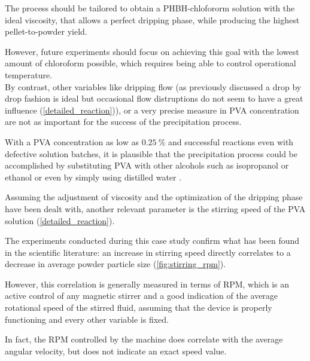 \documentclass{article}
\begin{document}
        The process should be tailored to obtain a PHBH-chlofororm solution with the ideal viscosity, that allows a perfect dripping 
        phase, while producing the highest pellet-to-powder yield. 

        However, future experiments should focus on achieving this goal with the lowest amount of chloroform possible, which requires 
        being able to control operational temperature. \\ 

        By contrast, other variables like dripping flow (as previously discussed a drop by drop fashion is ideal but occasional 
        flow distruptions do not seem to have a great influence (\ref{detailed_reaction})), or a very precise measure in 
        PVA concentration are not as important for the success of the precipitation process. 

        With a PVA concentration as low as $0.25 \ \%$ and successful reactions even with defective
        solution batches, it is plausible that the precipitation process could be accomplished by 
        substituting PVA with other alcohols such as isopropanol or ethanol or even by simply using distilled water \footnotemark.
        

        Assuming the adjustment of viscosity and the optimization of the dripping phase have been dealt with, 
        another relevant parameter is the stirring speed of the PVA solution (\ref{detailed_reaction}). 

        The experiments conducted during this case study confirm what has been found in the scientific literature: 
        an increase in stirring speed directly correlates to a decrease in average powder particle size (\ref{fig:stirring_rpm}). 

        However, this correlation is generally measured in terms of RPM, which is an active control of any magnetic stirrer and 
        a good indication of the average rotational speed of the stirred fluid, assuming that the device is properly functioning
        and every other variable is fixed. 
        
        In fact, the RPM controlled by the machine does correlate with the average angular velocity, but does not indicate 
        an exact speed value. 
\end{document}
